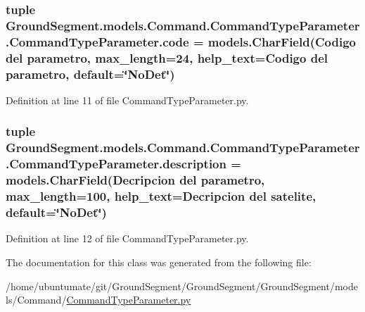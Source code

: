 \subsubsection[{code}]{\setlength{\rightskip}{0pt plus 5cm}tuple Ground\+Segment.\+models.\+Command.\+Command\+Type\+Parameter.\+Command\+Type\+Parameter.\+code = models.\+Char\+Field(\textquotesingle{}Codigo del parametro\textquotesingle{}, max\+\_\+length=24, help\+\_\+text=\textquotesingle{}Codigo del parametro\textquotesingle{}, default=\char`\"{}No\+Det\char`\"{})\hspace{0.3cm}{\ttfamily [static]}}\label{class_ground_segment_1_1models_1_1_command_1_1_command_type_parameter_1_1_command_type_parameter_a35d22bc7ba5de08aae11d2badbe4273a}


Definition at line 11 of file Command\+Type\+Parameter.\+py.

\hypertarget{class_ground_segment_1_1models_1_1_command_1_1_command_type_parameter_1_1_command_type_parameter_af58adf2c5f3eeee9bb86b6215ebfc5d6}{}
\subsubsection[{description}]{\setlength{\rightskip}{0pt plus 5cm}tuple Ground\+Segment.\+models.\+Command.\+Command\+Type\+Parameter.\+Command\+Type\+Parameter.\+description = models.\+Char\+Field(\textquotesingle{}Decripcion del parametro\textquotesingle{}, max\+\_\+length=100, help\+\_\+text=\textquotesingle{}Decripcion del satelite\textquotesingle{}, default=\char`\"{}No\+Det\char`\"{})\hspace{0.3cm}{\ttfamily [static]}}\label{class_ground_segment_1_1models_1_1_command_1_1_command_type_parameter_1_1_command_type_parameter_af58adf2c5f3eeee9bb86b6215ebfc5d6}


Definition at line 12 of file Command\+Type\+Parameter.\+py.



The documentation for this class was generated from the following file\+:\begin{DoxyCompactItemize}
\item 
/home/ubuntumate/git/\+Ground\+Segment/\+Ground\+Segment/\+Ground\+Segment/models/\+Command/\hyperlink{_command_type_parameter_8py}{Command\+Type\+Parameter.\+py}\end{DoxyCompactItemize}
